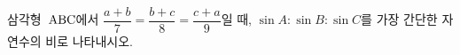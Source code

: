 삼각형~$\mathrm{ABC}$에서 $\dfrac{a+b}{7}=\dfrac{b+c}{8}=\dfrac{c+a}{9}$일 때, $\sin A:\sin B:\sin C$를 가장 간단한 자연수의 비로 나타내시오.
